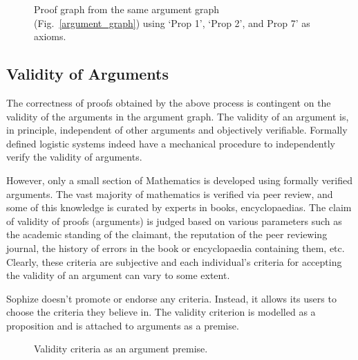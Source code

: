 \documentclass[runningheads]{llncs}
\begin{document}
\begin{figure}[!ht]
\begin{center}
\caption{Proof graph from the same argument graph (Fig.~\ref{argument_graph}) using `Prop 1', `Prop 2', and Prop 7' as axioms.}
\label{proof_graph2}
\end{center}
\end{figure}

\subsection{Validity of Arguments}

The correctness of proofs obtained by the above process is contingent on the validity of the arguments in the argument graph. The validity of an argument is, in principle, independent of other arguments and objectively verifiable. Formally defined logistic systems indeed have a mechanical procedure to independently verify the validity of arguments.

However, only a small section of Mathematics is developed using formally verified arguments. The vast majority of mathematics is verified via peer review, and some of this knowledge is curated by experts in books, encyclopaedias. The claim of validity of proofs (arguments) is judged based on various parameters such as the academic standing of the claimant, the reputation of the peer reviewing journal, the history of errors in the book or encyclopaedia containing them, etc. Clearly, these criteria are subjective and each individual's criteria for accepting the validity of an argument can vary to some extent.

Sophize doesn't promote or endorse any criteria. Instead, it allows its users to choose the criteria they believe in. The validity criterion is modelled as a proposition and is attached to arguments as a premise. 

\begin{figure}[!ht]
\begin{center}
\caption{Validity criteria as an argument premise.}
\label{validity_criterion}
\end{center}
\end{figure}
\end{document}
